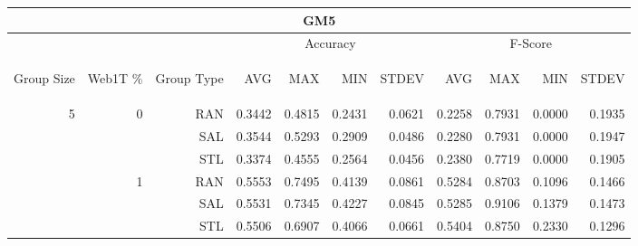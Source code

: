 \begin{center}
\begin{table}[htbp]
\begin{tabular}{ | r | r | r | r | r | r | r | r | r | r | r |}
\hline
\multicolumn{11}{|c|}{GM5}\\
\hline
 & & & \multicolumn{4}{|c|}{Accuracy} & \multicolumn{4}{|c|}{F-Score}\\ \cline{4-11}
\begin{sideways}Group Size\end{sideways} & \begin{sideways}Web1T \%\end{sideways} & \begin{sideways}Group Type\end{sideways} & \begin{sideways}AVG\end{sideways} & \begin{sideways}MAX\end{sideways} & \begin{sideways}MIN\end{sideways} & \begin{sideways}STDEV\end{sideways} & \begin{sideways}AVG\end{sideways} & \begin{sideways}MAX\end{sideways} & \begin{sideways}MIN\end{sideways} & \begin{sideways}STDEV\end{sideways}\\
\hline
\multirow{18}{*}{5}
 & \multirow{3}{*}{0} & RAN & 0.3442 & 0.4815 & 0.2431 & 0.0621 & 0.2258 & 0.7931 & 0.0000 & 0.1935\\ \cline{3-11}
 &   & SAL & 0.3544 & 0.5293 & 0.2909 & 0.0486 & 0.2280 & 0.7931 & 0.0000 & 0.1947\\ \cline{3-11}
 &   & STL & 0.3374 & 0.4555 & 0.2564 & 0.0456 & 0.2380 & 0.7719 & 0.0000 & 0.1905\\ \cline{2-11}
 & \multirow{3}{*}{1} & RAN & 0.5553 & 0.7495 & 0.4139 & 0.0861 & 0.5284 & 0.8703 & 0.1096 & 0.1466\\ \cline{3-11}
 &   & SAL & 0.5531 & 0.7345 & 0.4227 & 0.0845 & 0.5285 & 0.9106 & 0.1379 & 0.1473\\ \cline{3-11}
 &   & STL & 0.5506 & 0.6907 & 0.4066 & 0.0661 & 0.5404 & 0.8750 & 0.2330 & 0.1296\\ \cline{2-11}

\end{tabular}
\end{table}
\end{center}
